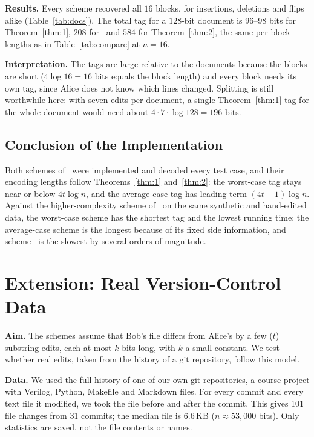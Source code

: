 \documentclass[journal,10pt]{IEEEtran}
\begin{document}
\textbf{Results.} Every scheme recovered all $16$ blocks, for insertions, deletions and flips alike (Table~\ref{tab:docs}). The total tag for a $128$-bit document is $96$--$98$ bits for Theorem~\ref{thm:1}, $208$ for~\cite{li21} and $584$ for Theorem~\ref{thm:2}, the same per-block lengths as in Table~\ref{tab:compare} at $n=16$.

\textbf{Interpretation.} The tags are large relative to the documents because the blocks are short ($4\log16=16$ bits equals the block length) and every block needs its own tag, since Alice does not know which lines changed. Splitting is still worthwhile here: with seven edits per document, a single Theorem~\ref{thm:1} tag for the whole document would need about $4\cdot7\cdot\log128=196$ bits.

\subsection{Conclusion of the Implementation}
Both schemes of~\cite{narayanan} were implemented and decoded every test case, and their encoding lengths follow Theorems~\ref{thm:1} and~\ref{thm:2}: the worst-case tag stays near or below $4t\log n$, and the average-case tag has leading term $(4t-1)\log n$. Against the higher-complexity scheme of~\cite{li21} on the same synthetic and hand-edited data, the worst-case scheme has the shortest tag and the lowest running time; the average-case scheme is the longest because of its fixed side information, and scheme~\cite{li21} is the slowest by several orders of magnitude.

\section{Extension: Real Version-Control Data}\label{sec:ext}
\textbf{Aim.} The schemes assume that Bob's file differs from Alice's by a few ($t$) substring edits, each at most $k$ bits long, with $k$ a small constant. We test whether real edits, taken from the history of a git repository, follow this model.

\textbf{Data.} We used the full history of one of our own git repositories, a course project with Verilog, Python, Makefile and Markdown files. For every commit and every text file it modified, we took the file before and after the commit. This gives 101 file changes from 31 commits; the median file is 6.6\,KB ($n\approx53{,}000$ bits). Only statistics are saved, not the file contents or names.
\end{document}
